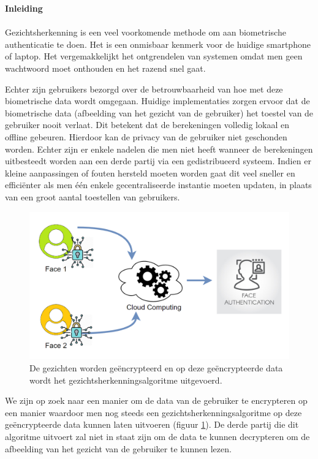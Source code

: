 \textbf{\Large{Inleiding}}\\\\
Gezichtsherkenning is een veel voorkomende methode om aan biometrische authenticatie te doen. Het is een onmisbaar kenmerk voor de huidige smartphone of laptop. Het vergemakkelijkt het ontgrendelen van systemen omdat men geen wachtwoord moet onthouden en het razend snel gaat.

Echter zijn gebruikers bezorgd over de betrouwbaarheid van hoe met deze biometrische data wordt omgegaan. Huidige implementaties zorgen ervoor dat de biometrische data (afbeelding van het gezicht van de gebruiker) het toestel van de gebruiker nooit verlaat. Dit betekent dat de berekeningen volledig lokaal en offline gebeuren. Hierdoor kan de privacy van de gebruiker niet geschonden worden. Echter zijn er enkele nadelen die men niet heeft wanneer de berekeningen uitbesteedt worden aan een derde partij via een gedistribueerd  systeem. Indien er kleine aanpassingen of fouten hersteld moeten worden gaat dit veel sneller en effici\"enter als men \'e\'en enkele gecentraliseerde instantie moeten updaten, in plaats van een groot aantal toestellen van gebruikers.

\begin{figure}[H]
  \includegraphics[scale=0.4]{fig/intro_overview.png}
  \centering
  \caption{De gezichten worden ge\"encrypteerd  en op deze ge\"encrypteerde data wordt het gezichtsherkenningsalgoritme uitgevoerd.}
  \label{fig:dutch_intro_overview}
\end{figure}

We zijn op zoek naar een manier om de data van de gebruiker te encrypteren op een manier waardoor men nog steeds een gezichtsherkenningsalgoritme op deze ge\"encrypteerde data kunnen laten uitvoeren (figuur \ref{fig:dutch_intro_overview}). De derde partij die dit algoritme uitvoert zal niet in staat zijn om de data te kunnen decrypteren om de afbeelding van het gezicht van de gebruiker te kunnen lezen.\\

